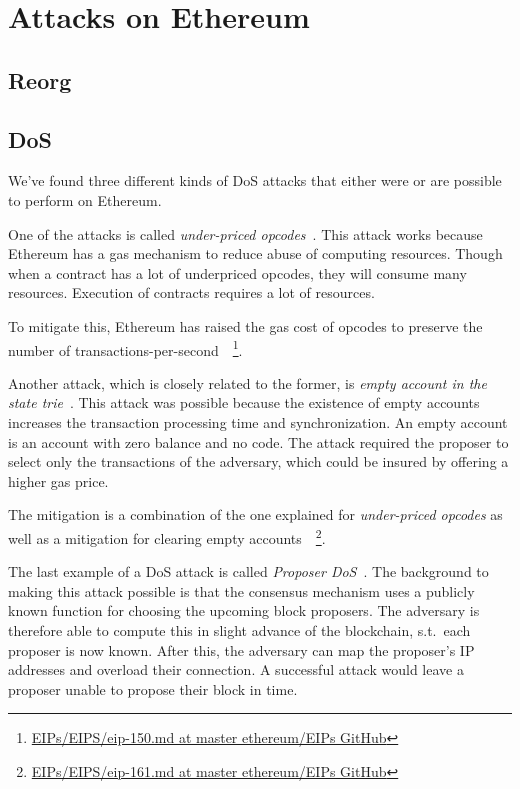 \section{Attacks on Ethereum}\label{sec:attacks-on-ethereum}
\subsection{Reorg}\label{subsec:reorg}

\subsection{DoS}\label{subsec:dos}
We've found three different kinds of DoS attacks that either were or are possible to perform on Ethereum.

One of the attacks is called \textit{under-priced opcodes}~\cite{10.1145/3391195,9815256}.
This attack works because Ethereum has a gas mechanism to reduce abuse of computing resources.
Though when a contract has a lot of underpriced opcodes, they will consume many resources.
Execution of contracts requires a lot of resources.

To mitigate this,
Ethereum has raised the gas cost of opcodes
to preserve the number of transactions-per-second~\cite{Opcode-mitigation}~\footnote{
\href{https://github.com/ethereum/EIPs/blob/master/EIPS/eip-150.md}{EIPs/EIPS/eip-150.md at master ethereum/EIPs GitHub}}.

Another attack,
which is closely related to the former, is \textit{empty account in the state trie}~\cite{10.1145/3391195,9815256}.
This attack was possible
because the existence of empty accounts increases the transaction processing time and synchronization.
An empty account is an account with zero balance and no code.
The attack required the proposer to select only the transactions of the adversary,
which could be insured by offering a higher gas price.

The mitigation is a combination of the one
explained for \textit{under-priced opcodes} as well as a mitigation
for clearing empty accounts~\cite{Opcode-mitigation,empty-account-mitigation,empty-account-eip-mitigation}~\footnote{
\href{https://github.com/ethereum/EIPs/blob/master/EIPS/eip-161.md}{EIPs/EIPS/eip-161.md at master ethereum/EIPs GitHub}}.

The last example of a DoS attack is called \textit{Proposer DoS}~\cite{EthereumSSLE2024,EthereumAttackDefense2024}.
The background to making this attack possible is
that the consensus mechanism uses a publicly known function for choosing the upcoming block proposers.
The adversary is therefore able to compute this in slight advance of the blockchain, s.t.\ each proposer is now known.
After this, the adversary can map the proposer's IP addresses and overload their connection.
A successful attack would leave a proposer unable to propose their block in time.

